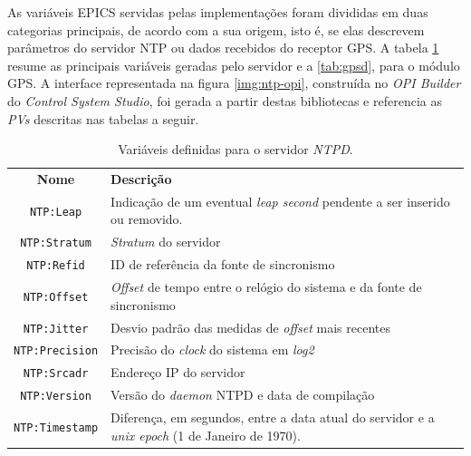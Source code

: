 \vspace{12pt}

As variáveis EPICS servidas pelas implementações foram divididas em duas
categorias principais, de acordo com a sua origem, isto é, se elas
descrevem parâmetros do servidor NTP ou dados recebidos do receptor GPS. A
tabela \ref{tab:ntpd} resume as principais variáveis geradas pelo servidor e a
\ref{tab:gpsd}, para o módulo GPS. A interface representada na figura
\ref{img:ntp-opi}, construída no \textit{OPI Builder} do \textit{Control System
Studio}, foi gerada a partir destas bibliotecas e referencia as \textit{PVs}
descritas nas tabelas a seguir.

\begin{table}[h]

	\centering
	\caption{\label{tab:ntpd} Variáveis definidas para o servidor
	\textit{NTPD}.}
	\begin{tabular}{| c | p{} |}
		\hline
		\textbf{Nome} & \textbf{Descrição} \\	\hhline{|=|=|}
		\texttt{NTP:Leap} & Indicação de um eventual \textit{leap second} pendente a
		ser inserido ou removido. \\
		\hline \texttt{NTP:Stratum} & \textit{Stratum} do servidor \\ \hline
		\texttt{NTP:Refid} & ID de referência da fonte de sincronismo \\ \hline
		\texttt{NTP:Offset} & \textit{Offset} de tempo entre o relógio do sistema e da
		fonte de sincronismo \\
		\hline \texttt{NTP:Jitter} & Desvio padrão das medidas de \textit{offset} mais
		recentes \\ \hline 
		\texttt{NTP:Precision} & Precisão do \textit{clock} do sistema em
		\textit{log2} \\
		\hline \texttt{NTP:Srcadr} & Endereço IP do servidor \\ \hline 			
		\texttt{NTP:Version} & Versão do \textit{daemon} NTPD e data de compilação \\
		\hline \texttt{NTP:Timestamp} & Diferença, em segundos, entre a data atual do
		servidor e a \textit{unix epoch} (1 de Janeiro de 1970). \\ \hline
	\end{tabular}	    
\end{table}

